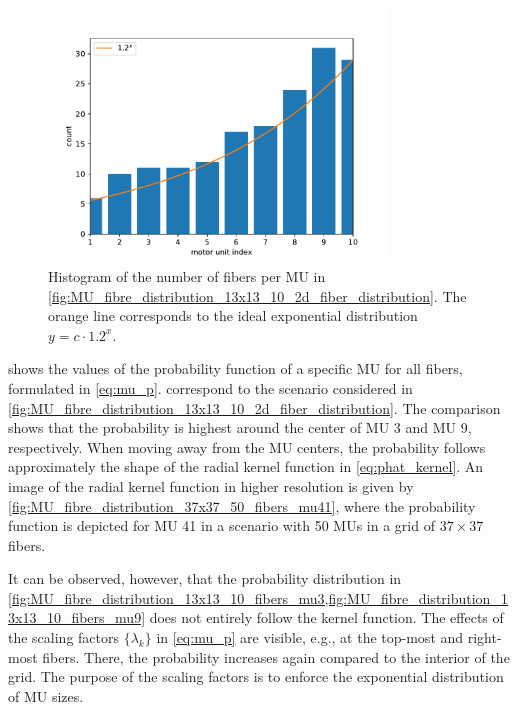 \begin{figure}%
  \centering%
  \includegraphics[width=0.8\textwidth]{images/motor_unit_assignment/MU_fibre_distribution_13x13_10_fiber_distribution.pdf}%
  \caption{Histogram of the number of fibers per MU in \cref{fig:MU_fibre_distribution_13x13_10_2d_fiber_distribution}. The orange line corresponds to the ideal exponential distribution $y=c\cdot 1.2^x$.}%
  \label{fig:MU_fibre_distribution_13x13_10_fiber_distribution}%
\end{figure}

 shows the values of the probability function of a specific MU for all fibers, formulated in \cref{eq:mu_p}.  correspond to the scenario considered in \cref{fig:MU_fibre_distribution_13x13_10_2d_fiber_distribution}. The comparison shows that the probability is highest around the center of MU 3 and MU 9, respectively. When moving away from the MU centers, the probability follows approximately the shape of the radial kernel function in \cref{eq:phat_kernel}.
An image of the radial kernel function in higher resolution is given by \cref{fig:MU_fibre_distribution_37x37_50_fibers_mu41}, where the probability function is depicted for MU 41 in a scenario with 50 MUs in a grid of $37 \times 37$ fibers.

It can be observed, however, that the probability distribution in \cref{fig:MU_fibre_distribution_13x13_10_fibers_mu3,fig:MU_fibre_distribution_13x13_10_fibers_mu9} does not entirely follow the kernel function. The effects of the scaling factors $\{\lambda_k\}$ in \cref{eq:mu_p} are visible, e.g., at the top-most and right-most fibers. There, the probability increases again compared to the interior of the grid. The purpose of the scaling factors is to enforce the exponential distribution of MU sizes.

